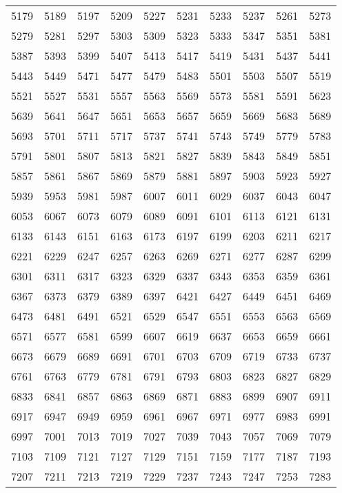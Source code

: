\begin{longtable}{llllllllll}
5179	&	5189	&	5197	&	5209	&	5227	&	5231	&	5233	&	5237	&	5261	&	5273	\\
5279	&	5281	&	5297	&	5303	&	5309	&	5323	&	5333	&	5347	&	5351	&	5381	\\
5387	&	5393	&	5399	&	5407	&	5413	&	5417	&	5419	&	5431	&	5437	&	5441	\\
5443	&	5449	&	5471	&	5477	&	5479	&	5483	&	5501	&	5503	&	5507	&	5519	\\
5521	&	5527	&	5531	&	5557	&	5563	&	5569	&	5573	&	5581	&	5591	&	5623	\\
5639	&	5641	&	5647	&	5651	&	5653	&	5657	&	5659	&	5669	&	5683	&	5689	\\
5693	&	5701	&	5711	&	5717	&	5737	&	5741	&	5743	&	5749	&	5779	&	5783	\\
5791	&	5801	&	5807	&	5813	&	5821	&	5827	&	5839	&	5843	&	5849	&	5851	\\
5857	&	5861	&	5867	&	5869	&	5879	&	5881	&	5897	&	5903	&	5923	&	5927	\\
5939	&	5953	&	5981	&	5987	&	6007	&	6011	&	6029	&	6037	&	6043	&	6047	\\
6053	&	6067	&	6073	&	6079	&	6089	&	6091	&	6101	&	6113	&	6121	&	6131	\\
6133	&	6143	&	6151	&	6163	&	6173	&	6197	&	6199	&	6203	&	6211	&	6217	\\
6221	&	6229	&	6247	&	6257	&	6263	&	6269	&	6271	&	6277	&	6287	&	6299	\\
6301	&	6311	&	6317	&	6323	&	6329	&	6337	&	6343	&	6353	&	6359	&	6361	\\
6367	&	6373	&	6379	&	6389	&	6397	&	6421	&	6427	&	6449	&	6451	&	6469	\\
6473	&	6481	&	6491	&	6521	&	6529	&	6547	&	6551	&	6553	&	6563	&	6569	\\
6571	&	6577	&	6581	&	6599	&	6607	&	6619	&	6637	&	6653	&	6659	&	6661	\\
6673	&	6679	&	6689	&	6691	&	6701	&	6703	&	6709	&	6719	&	6733	&	6737	\\
6761	&	6763	&	6779	&	6781	&	6791	&	6793	&	6803	&	6823	&	6827	&	6829	\\
6833	&	6841	&	6857	&	6863	&	6869	&	6871	&	6883	&	6899	&	6907	&	6911	\\
6917	&	6947	&	6949	&	6959	&	6961	&	6967	&	6971	&	6977	&	6983	&	6991	\\
6997	&	7001	&	7013	&	7019	&	7027	&	7039	&	7043	&	7057	&	7069	&	7079	\\
7103	&	7109	&	7121	&	7127	&	7129	&	7151	&	7159	&	7177	&	7187	&	7193	\\
7207	&	7211	&	7213	&	7219	&	7229	&	7237	&	7243	&	7247	&	7253	&	7283	\\

\end{longtable}

